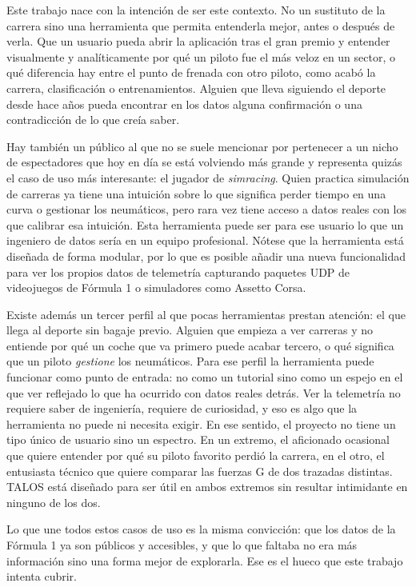 \documentclass[12pt,a4paper,twoside,openright]{book}
\begin{document}
\noindent Este trabajo nace con la intención de ser este contexto. No un sustituto de la carrera sino una herramienta que permita entenderla mejor, antes o después de verla. Que un usuario pueda abrir la aplicación tras el gran premio y entender visualmente y analíticamente por qué un piloto fue el más veloz en un sector, o qué diferencia
hay entre el punto de frenada con otro piloto, como acabó la carrera, clasificación o entrenamientos. Alguien que lleva siguiendo el deporte desde hace años pueda encontrar en los datos alguna confirmación o una contradicción de lo que creía saber.

\noindent Hay también un público al que no se suele mencionar por pertenecer a un nicho de espectadores que hoy en día se está volviendo más grande y representa quizás el caso de uso más interesante: el jugador de \textit{simracing}. Quien practica simulación de carreras ya tiene una intuición sobre lo que significa
perder tiempo en una curva o gestionar los neumáticos, pero rara vez tiene acceso a datos reales con los que calibrar esa intuición. Esta herramienta puede ser para ese usuario lo que un ingeniero de datos sería en un equipo profesional. Nótese que la herramienta está diseñada de forma modular, por lo que es posible añadir una nueva funcionalidad para ver los 
propios datos de telemetría capturando paquetes UDP de videojuegos de Fórmula 1 o simuladores como Assetto Corsa.

\noindent Existe además un tercer perfil al que pocas herramientas prestan atención: el que llega al deporte sin bagaje previo. Alguien que empieza a ver carreras y no entiende por qué un coche que va primero puede acabar tercero, o qué significa que un piloto \textit{gestione} los neumáticos.
Para ese perfil la herramienta puede funcionar como punto de entrada: no como un tutorial sino como un espejo en el que ver reflejado lo que ha ocurrido con datos reales detrás. Ver la telemetría no requiere saber de ingeniería, requiere de curiosidad, y eso es algo que la herramienta no puede ni necesita exigir.
\noindent En ese sentido, el proyecto no tiene un tipo único de usuario sino un espectro. En un extremo, el aficionado ocasional que quiere entender por qué su piloto favorito perdió la carrera, en el otro, el entusiasta técnico que quiere comparar las fuerzas G de dos trazadas distintas. TALOS está diseñado para ser útil en ambos extremos sin resultar intimidante en ninguno de los dos.

\noindent Lo que une todos estos casos de uso es la misma convicción: que los datos de la Fórmula 1 ya son públicos y accesibles, y que lo que faltaba no era más información sino una forma mejor de explorarla. Ese es el hueco que este trabajo intenta cubrir.
\end{document}
